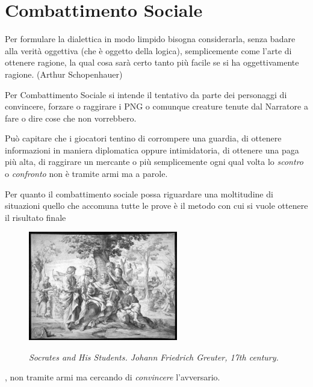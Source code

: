 \section{Combattimento Sociale}

\begin{enfasi}{

Per formulare la dialettica in modo limpido bisogna considerarla, senza badare alla verità oggettiva (che è oggetto della logica), semplicemente come l'arte di ottenere ragione, la qual cosa sarà certo tanto più facile se si ha oggettivamente ragione. (Arthur Schopenhauer)

}\end{enfasi}

\begin{multicols}{2}

Per Combattimento Sociale si intende il tentativo da parte dei personaggi di convincere, forzare o raggirare i PNG o comunque creature tenute dal Narratore a fare o dire cose che non vorrebbero.

Può capitare che i giocatori tentino di corrompere una guardia, di ottenere informazioni in maniera diplomatica oppure intimidatoria, di ottenere una paga più alta, di raggirare un mercante o più semplicemente ogni qual volta lo \emph{scontro} o \emph{confronto} non è tramite armi ma a parole.

Per quanto il combattimento sociale possa riguardare una moltitudine di situazioni quello che accomuna tutte le prove è il metodo con cui si vuole ottenere il risultato finale

\begin{figure}%

\centering
\includegraphics[width=6.5cm]{immagini/Greuter_Socrates.png}

\emph{Socrates and His Students. Johann Friedrich Greuter, 17th century.}
\end{figure}

, non tramite armi ma cercando di \emph{convincere} l'avversario.


\end{multicols}
